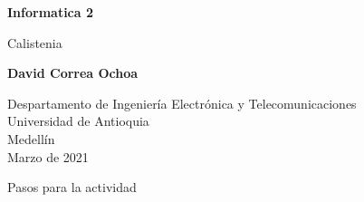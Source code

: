 \documentclass{article}
\begin{document}
\begin{titlepage}
    \begin{center}
        \vspace*{1cm}
            
        \huge
        \textbf{Informatica 2 }
            
        \vspace{0.5cm}
        \LARGE
        Calistenia
            
        \vspace{1.5cm}
            
        \textbf{David Correa Ochoa}
            
        \vfill
            
        \vspace{0.8cm}
            
        \Large
        Despartamento de Ingeniería Electrónica y Telecomunicaciones\\
        Universidad de Antioquia\\
        Medellín\\
        Marzo de 2021
            
    \end{center}
\end{titlepage}

\begin{center}
    \huge
    Pasos para la actividad
\end{center}
\end{document}
